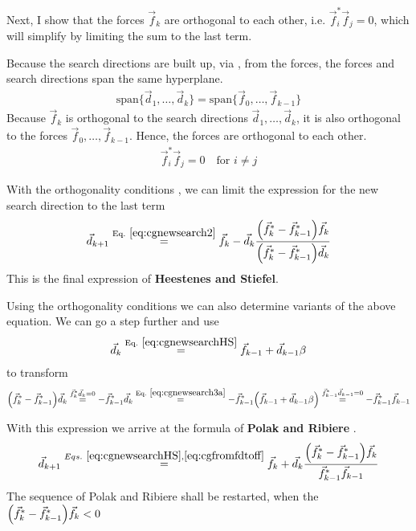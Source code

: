 \documentclass[11pt,a4paper]{report}
\begin{document}
Next, I show that the forces $\vec{f}_k$ are orthogonal to each other,
i.e. $\vec{f}_i^*\vec{f}_j=0$, which will simplify
 by limiting the sum to the last term.

Because the search directions are built up, via
, from the forces, the forces and search
directions span the same hyperplane.
\begin{eqnarray}
\text{span}\{\vec{d}_1,\ldots,\vec{d}_k\}=
\text{span}\{\vec{f}_0,\ldots,\vec{f}_{k-1}\}
\end{eqnarray}
Because $\vec{f}_k$ is orthogonal to the search directions
$\vec{d}_1,\ldots,\vec{d}_k$, it is also orthogonal to the forces
$\vec{f}_0,\ldots,\vec{f}_{k-1}$. Hence, the forces are orthogonal to
each other.
\begin{eqnarray}
\vec{f}_i^*\vec{f}_j=0\quad\text{for $i\neq j$}
\label{eq:cgorthogonalityforces}
\end{eqnarray}

With the orthogonality conditions , we
can limit the expression for the new search direction to the last term
\begin{eqnarray}
\vec{d}_{k+1}\eqrel{eq:cgnewsearch2}{=}\vec{f}_k
-\vec{d}_k
\frac{\Bigl(\vec{f}_k^*-\vec{f}_{k-1}^*\Bigr)\vec{f}_k}
{\Bigl(\vec{f}_k^*-\vec{f}_{k-1}^*\Bigr)\vec{d}_k}
\label{eq:cgnewsearchHS}
\end{eqnarray}
This is the final expression of
\textbf{Heestenes and Stiefel}.

Using the orthogonality conditions we can also determine variants of
the above equation.  We can go a step further and use
\begin{eqnarray}
\vec{d}_k\eqrel{eq:cgnewsearchHS}{=}\vec{f}_{k-1}+\vec{d}_{k-1}\beta
\label{eq:cgnewsearch3a}
\end{eqnarray}
to transform
\begin{eqnarray}
\Bigl(\vec{f}_k^*-\vec{f}_{k-1}^*\Bigr)\vec{d}_k
\stackrel{\vec{f}_k^*\vec{d}_k=0}{=}
-\vec{f}_{k-1}^*\vec{d}_k
\eqrel{eq:cgnewsearch3a}{=}
-\vec{f}_{k-1}^*\Bigl(\vec{f}_{k-1}+\vec{d}_{k-1}\beta\Bigr)
\stackrel{\vec{f}_{k-1}^*\vec{d}_{k-1}=0}{=}
-\vec{f}_{k-1}^*\vec{f}_{k-1}
\label{eq:cgfromfdtoff}
\end{eqnarray}

With this expression we arrive at the formula of \textbf{Polak and Ribiere}
.
\begin{eqnarray}
\vec{d}_{k+1}
\stackrel{Eqs.~\ref{eq:cgnewsearchHS},\ref{eq:cgfromfdtoff}}{=}
\vec{f}_k
+\vec{d}_k
\frac{\Bigl(\vec{f}_k^*-\vec{f}_{k-1}^*\Bigr)\vec{f}_k}
{\vec{f}_{k-1}^*\vec{f}_{k-1}}
\label{eq:cgnewsearchPR}
\end{eqnarray}
The sequence of Polak and Ribiere shall be restarted, when the 
$\Bigl(\vec{f}_k^*-\vec{f}_{k-1}^*\Bigr)\vec{f}_k<0$
\end{document}
